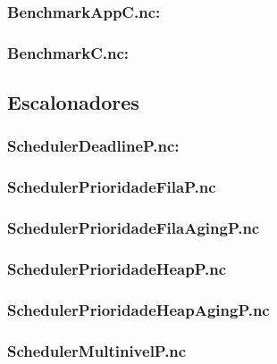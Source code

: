 \documentclass[a4paper, 10pt]{article}
\begin{document}
    \subsubsection{BenchmarkAppC.nc:}
    

    \subsubsection{BenchmarkC.nc:}
    

\subsection{Escalonadores}
    \subsubsection{SchedulerDeadlineP.nc:}
    \label{a:edf}

    \subsubsection{SchedulerPrioridadeFilaP.nc}
    \label{a:prioridades-fila}

    \subsubsection{SchedulerPrioridadeFilaAgingP.nc}
    \label{a:prioridades-fila-aging}

    \subsubsection{SchedulerPrioridadeHeapP.nc}
    \label{a:prioridades-heap}

    \subsubsection{SchedulerPrioridadeHeapAgingP.nc}
    \label{a:prioridades-heap-aging}

    \subsubsection{SchedulerMultinivelP.nc}
    



\end{document}
